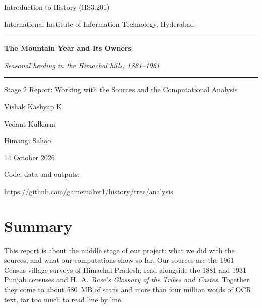 \documentclass[10pt,a4paper,twocolumn]{article}
\begin{document}
\begin{titlepage}
\centering
\vspace*{1.5cm}
{\large Introduction to History (HS3.201)\par}
{\large International Institute of Information Technology, Hyderabad\par}
\vspace{2.5cm}
{\color{maroon}\rule{0.6\textwidth}{0.6pt}\par}
\vspace{0.6cm}
{\Huge\bfseries\color{maroon}The Mountain Year and Its Owners\par}
\vspace{0.4cm}
{\Large\itshape\color{maroon!80!black}Seasonal herding in the Himachal hills, 1881--1961\par}
\vspace{0.6cm}
{\color{maroon}\rule{0.6\textwidth}{0.6pt}\par}
\vspace{1cm}
{\large Stage 2 Report: Working with the Sources and the Computational Analysis\par}
\vspace{2cm}
{\large Vishak Kashyap K\par}
\vspace{0.15cm}
{\large Vedant Kulkarni\par}
\vspace{0.15cm}
{\large Himangi Sahoo\par}
\vspace{1.2cm}
{\large\color{muted}14 October 2026\par}
\vfill
{\small\color{muted}Code, data and outputs:\par}
\vspace{2pt}
{\small\url{https://github.com/gamemaker1/history/tree/analysis}\par}
\vspace{1cm}
\end{titlepage}
\onecolumn

\section*{Summary}

This report is about the middle stage of our project: what we did with the sources, and what our computations show so far. Our sources are the 1961 Census village surveys of Himachal Pradesh, read alongside the 1881 and 1931 Punjab censuses and H.~A.~Rose's \emph{Glossary of the Tribes and Castes}. Together they come to about 580~MB of scans and more than four million words of OCR text, far too much to read line by line.
\end{document}
